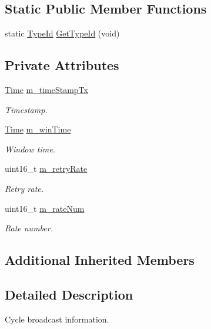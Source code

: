 \subsection*{Static Public Member Functions}
\begin{DoxyCompactItemize}
\item 
static \hyperlink{classns3_1_1TypeId}{Type\+Id} \hyperlink{classns3_1_1UanHeaderRcCtsGlobal_a2f1460fe91c562e7a979b03bc21f79a4}{Get\+Type\+Id} (void)
\end{DoxyCompactItemize}
\subsection*{Private Attributes}
\begin{DoxyCompactItemize}
\item 
\hyperlink{classns3_1_1Time}{Time} \hyperlink{classns3_1_1UanHeaderRcCtsGlobal_a82d4b0313adc6b3fa9a2a298a50e05e7}{m\+\_\+time\+Stamp\+Tx}
\begin{DoxyCompactList}\small\item\em Timestamp. \end{DoxyCompactList}\item 
\hyperlink{classns3_1_1Time}{Time} \hyperlink{classns3_1_1UanHeaderRcCtsGlobal_a94365aeacbedf98a9a92b3c310a591d3}{m\+\_\+win\+Time}
\begin{DoxyCompactList}\small\item\em Window time. \end{DoxyCompactList}\item 
uint16\+\_\+t \hyperlink{classns3_1_1UanHeaderRcCtsGlobal_aa7588bb1625f48a895edc716b65bf24d}{m\+\_\+retry\+Rate}
\begin{DoxyCompactList}\small\item\em Retry rate. \end{DoxyCompactList}\item 
uint16\+\_\+t \hyperlink{classns3_1_1UanHeaderRcCtsGlobal_aab64634e1ec36ba1f872ec8ce0054958}{m\+\_\+rate\+Num}
\begin{DoxyCompactList}\small\item\em Rate number. \end{DoxyCompactList}\end{DoxyCompactItemize}
\subsection*{Additional Inherited Members}


\subsection{Detailed Description}
Cycle broadcast information.

